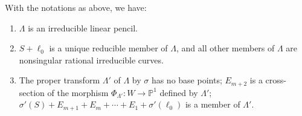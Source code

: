 \begin{lemma*}
With the notations as above, we have:
\begin{enumerate}
\renewcommand{\labelenumi}{\rm(\theenumi)}
\item $\Lambda$ is an irreducible linear pencil.

\item $S+\ell_{0}$ is a unique reducible member of $\Lambda$, and all
  other members of $\Lambda$ are nonsingular rational irreducible
  curves.

\item The proper transform $\Lambda'$ of $\Lambda$ by $\sigma$ has no
  base points; $E_{m+2}$ is a cross-section of the morphism
  $\Phi_{\Lambda'}:W\to \mathbb{P}^{1}$ defined by $\Lambda'$;
  $\sigma'(S)+E_{m+1}+E_{m}+\cdots+E_{1}+\sigma'(\ell_{0})$ is a
  member of $\Lambda'$.
\end{enumerate}
\end{lemma*}

